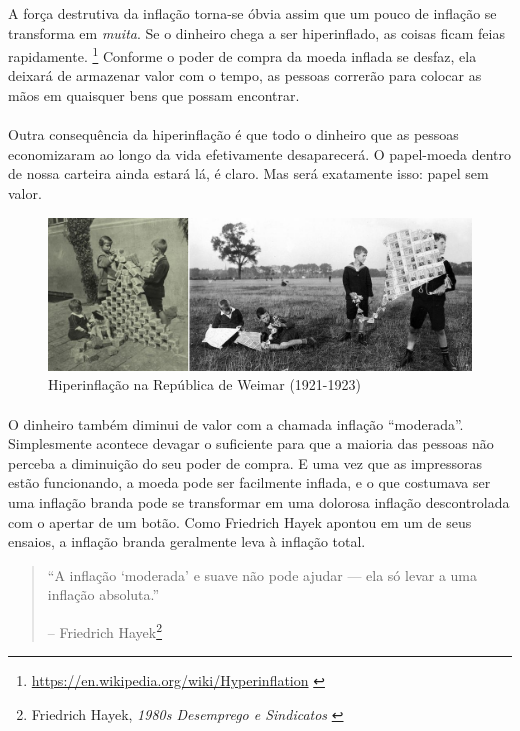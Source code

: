 A força destrutiva da inflação torna-se óbvia assim que um pouco de inflação se transforma em \textit{muita}. Se o dinheiro chega a ser hiperinflado, as coisas ficam feias rapidamente. \footnote{\url{https://en.wikipedia.org/wiki/Hyperinflation} \cite{wiki:hyperinflation}} Conforme o poder de compra da moeda inflada se desfaz, ela deixará de armazenar valor com o tempo, as pessoas correrão para colocar as mãos em quaisquer bens que possam encontrar.

\paragraph{}
Outra consequência da hiperinflação é que todo o dinheiro que as pessoas economizaram ao longo da vida efetivamente desaparecerá. O papel-moeda dentro de nossa carteira ainda estará lá, é claro. Mas será exatamente isso: papel sem valor.

\begin{figure}
  \includegraphics{assets/images/children-playing-with-money.png}
  \caption{Hiperinflação na República de Weimar (1921-1923)}
  \label{fig:children-playing-with-money}
\end{figure}

\paragraph{}
O dinheiro também diminui de valor com a chamada inflação \enquote{moderada}. Simplesmente acontece devagar o suficiente para que a maioria das pessoas não perceba a diminuição do seu poder de compra. E uma vez que as impressoras estão funcionando, a moeda pode ser facilmente inflada, e o que costumava ser uma inflação branda pode se transformar em uma dolorosa inflação descontrolada com o apertar de um botão. Como Friedrich Hayek apontou em um de seus ensaios, a inflação branda geralmente leva à inflação total.

\begin{quotation}\begin{samepage}
\enquote{A inflação `moderada' e suave não pode ajudar --- ela só levar a uma inflação absoluta.}
\begin{flushright} -- Friedrich Hayek\footnote{Friedrich Hayek, \textit{1980s
Desemprego e Sindicatos} \cite{hayek-inflation}}
\end{flushright}\end{samepage}\end{quotation}

